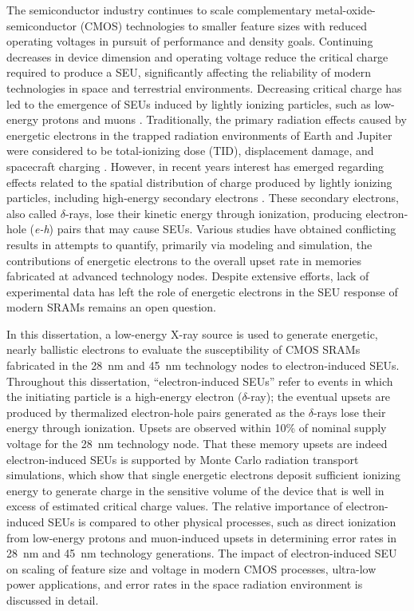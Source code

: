 The semiconductor industry continues to scale complementary metal-oxide-semiconductor (CMOS) technologies to smaller feature sizes with reduced operating voltages in pursuit of performance and density goals.
Continuing decreases in device dimension and operating voltage reduce the critical charge required to produce a SEU, significantly affecting the reliability of modern technologies in space and terrestrial environments. 
Decreasing critical charge has led to the emergence of SEUs induced by lightly ionizing particles, such as low-energy protons and muons \cite{Rodbell:2007vl, Sierawski:2010cj}. 
Traditionally, the primary radiation effects caused by energetic electrons in the trapped radiation environments of Earth and Jupiter were considered to be total-ionizing dose (TID), displacement damage, and spacecraft charging \cite{Bourdarie:kj, Xapsos:2013cu}. 
However, in recent years interest has emerged regarding effects related to the spatial distribution of charge produced by lightly ionizing particles, including high-energy secondary electrons \cite{Weller:2003je, Raine:2010cna, Raine:gk, Raine:2012gi, King:2010cu, King:2012cb, Barak:2012im}. 
These secondary electrons, also called $\delta$-rays, lose their kinetic energy through ionization, producing electron-hole (\emph{e-h}) pairs that may cause SEUs. 
Various studies \cite{Weller:2003je, Raine:2010cna, Raine:gk, Raine:2012gi, King:2010cu, King:2012cb, Barak:2012im} have obtained conflicting results in attempts to quantify, primarily via modeling and simulation, the contributions of energetic electrons to the overall upset rate in memories fabricated at advanced technology nodes. 
Despite extensive efforts, lack of experimental data has left the role of energetic electrons in the SEU response of modern SRAMs remains an open question.%

In this dissertation, a low-energy X-ray source is used to generate energetic, nearly ballistic electrons to evaluate the susceptibility of CMOS SRAMs fabricated in the 28~nm and 45~nm technology nodes to electron-induced SEUs. 
Throughout this dissertation, ``electron-induced SEUs'' refer to events in which the initiating particle is a high-energy electron ($\delta$-ray); the eventual upsets are produced by thermalized electron-hole pairs generated as the $\delta$-rays lose their energy through ionization. 
Upsets are observed within 10\% of nominal supply voltage for the 28~nm technology node. 
That these memory upsets are indeed electron-induced SEUs is supported by Monte Carlo radiation transport simulations, which show that single energetic electrons deposit sufficient ionizing energy to generate charge in the sensitive volume of the device that is well in excess of estimated critical charge values. 
The relative importance of electron-induced SEUs is compared to other physical processes, such as direct ionization from low-energy protons \cite{Rodbell:2007vl, Heidel:2008vf, Heidel:2009vx, Sierawski:2009ka} and muon-induced upsets \cite{Sierawski:2010cj, Sierawski:2011bn} in determining error rates in 28~nm and 45~nm technology generations. 
The impact of electron-induced SEU on scaling of feature size and voltage in modern CMOS processes, ultra-low power applications, and error rates in the space radiation environment is discussed in detail.

